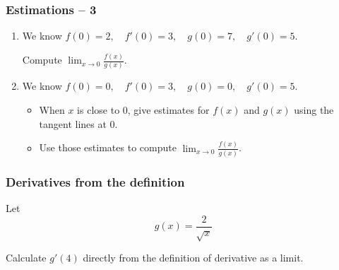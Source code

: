 \documentclass[14pt]{beamer}
\begin{document}
	\begin{frame}[t]
		\fontsize{13}{13}\selectfont
		\frametitle{Estimations -- 3}


		\begin{enumerate}
			\item We know \quad $\displaystyle f(0) = 2, \quad f'(0) = 3, \quad g(0) =
				7, \quad g'(0) = 5.$

				\vspace{.2cm}
				Compute \; $\displaystyle \lim_{x \to 0}\frac{f(x)}{g(x)}$.

				\vfill

			\item We know \quad $\displaystyle f(0) = 0, \quad f'(0) = 3, \quad g(0) =
				0, \quad g'(0) = 5.$

				\vspace{.2cm}
				\begin{itemize}
					\item When $x$ is close to $0$, give estimates for
						$\displaystyle f(x)$ and $\displaystyle g(x)$ using the tangent
						lines at $0$.

					\item Use those estimates to compute \; $\displaystyle \lim_{x \to 0}\frac{f(x)}{g(x)}$.
				\end{itemize}
		\end{enumerate}

		\vfill
	\end{frame}





	\begin{frame}[t]
		\frametitle{Derivatives from the definition}

		Let
		\[
			g(x) = \frac{2}{\sqrt{x}}
		\]

		Calculate $\displaystyle g'(4)$ directly from the definition of derivative as
		a limit.
	\end{frame}

\end{document}
